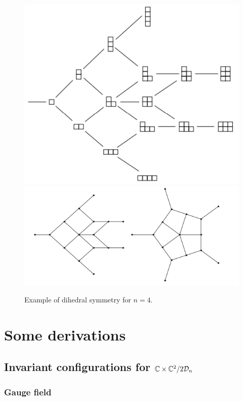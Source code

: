             \begin{figure}[H]
                \centering
                \includegraphics[scale=0.45]{Pictures/suter1.png}
                \includegraphics[scale=0.45]{Pictures/suter2.png}
                \caption{Example of dihedral symmetry for $n=4$.}
            \end{figure}

\section{Some derivations}

    \subsection{Invariant configurations for $\mathbb{C}\times\mathbb{C}^2/2\mathcal{D}_n$}\label{app:invconfDn}

        \subsubsection{Gauge field}

